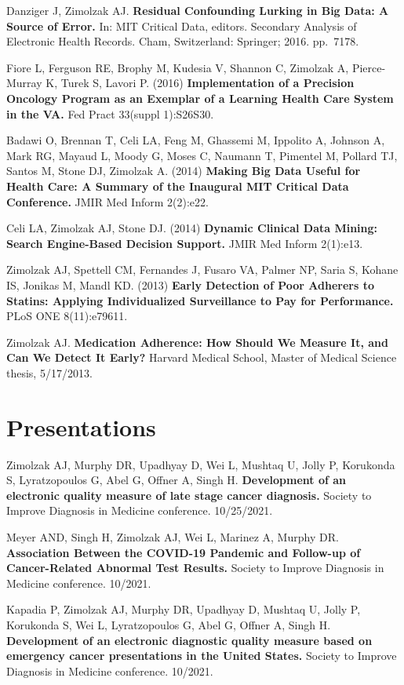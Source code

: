 \documentclass[10pt]{article}
\begin{document}
Danziger J, Zimolzak AJ. \textbf{Residual Confounding Lurking in Big
  Data: A Source of Error.} In: MIT Critical Data, editors. Secondary
Analysis of Electronic Health Records. Cham, Switzerland: Springer;
2016. pp.\ 71\ndash{}78.

Fiore L, Ferguson RE, Brophy M, Kudesia V, Shannon C, Zimolzak A,
Pierce-Murray K, Turek S, Lavori P. (2016) \textbf{Implementation of a
  Precision Oncology Program as an Exemplar of a Learning Health Care
  System in the VA.} Fed Pract 33(suppl 1):S26\ndash{}S30.

Badawi O, Brennan T, Celi LA, Feng M, Ghassemi M, Ippolito A, Johnson
A, Mark RG, Mayaud L, Moody G, Moses C, Naumann T, Pimentel M, Pollard
TJ, Santos M, Stone DJ, Zimolzak A. (2014) \textbf{Making Big Data
  Useful for Health Care: A Summary of the Inaugural MIT Critical Data
  Conference.} JMIR Med Inform 2(2):e22.

Celi LA, Zimolzak AJ, Stone DJ. (2014) \textbf{Dynamic Clinical Data
  Mining: Search Engine-Based Decision Support.} JMIR Med Inform
2(1):e13.

Zimolzak AJ, Spettell CM, Fernandes J, Fusaro VA, Palmer NP, Saria S,
Kohane IS, Jonikas M, Mandl KD. (2013) \textbf{Early Detection of Poor
  Adherers to Statins: Applying Individualized Surveillance to Pay for
  Performance.} PLoS ONE 8(11):e79611.

Zimolzak AJ. \textbf{Medication Adherence: How Should We Measure It,
  and Can We Detect It Early?} Harvard Medical School, Master of
Medical Science thesis, 5/17/2013.


\section*{Presentations} %

Zimolzak AJ, Murphy DR, Upadhyay D, Wei L, Mushtaq U, Jolly P,
Korukonda S, Lyratzopoulos G, Abel G, Offner A, Singh H.
\textbf{Development of an electronic quality measure of late stage
  cancer diagnosis.} Society to Improve Diagnosis in Medicine
conference. 10/25/2021.

Meyer AND, Singh H, Zimolzak AJ, Wei L, Marinez A, Murphy DR.
\textbf{Association Between the COVID-19 Pandemic and Follow-up of
  Cancer-Related Abnormal Test Results.} Society to Improve Diagnosis
in Medicine conference. 10/2021.

Kapadia P, Zimolzak AJ, Murphy DR, Upadhyay D, Mushtaq U, Jolly P,
Korukonda S, Wei L, Lyratzopoulos G, Abel G, Offner A, Singh H.
\textbf{Development of an electronic diagnostic quality measure based
  on emergency cancer presentations in the United States.} Society to
Improve Diagnosis in Medicine conference. 10/2021.
\end{document}

